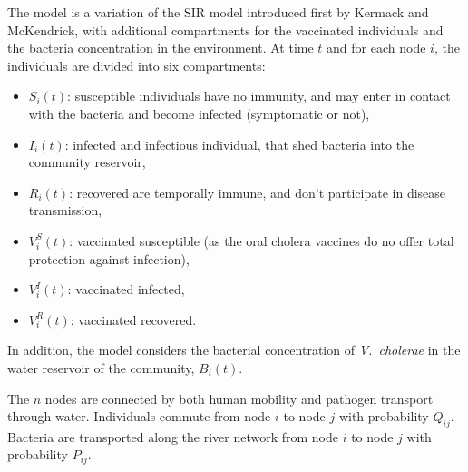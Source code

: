 The model is a variation of the SIR model introduced first by Kermack and McKendrick\cite{Kermack:ContributionMathematicalTheory:1927}, with additional compartments for the vaccinated individuals and the bacteria concentration in the environment. At time $t$ and for each node $i$, the individuals are divided into six compartments:
\begin{itemize}
\item $S_i(t)$: susceptible individuals  have no immunity, and may enter in contact with the bacteria and become infected (symptomatic or not),
\item $I_i(t)$: infected and infectious individual, that shed bacteria into the community reservoir,
\item $R_i(t)$: recovered are temporally immune, and don't participate in disease transmission,
\item $V^S_i(t)$: vaccinated susceptible (as the oral cholera vaccines do no offer total protection against infection),
\item $V^I_i(t)$: vaccinated infected,
\item $V^R_i(t)$: vaccinated recovered.
\end{itemize}

In addition, the model considers the bacterial concentration of \textit{V.~cholerae} in the water reservoir of the community, $B_i(t)$. 

The $n$ nodes are connected by both human mobility and pathogen transport through water. Individuals commute from node $i$ to node $j$ with probability $Q_{ij}$. Bacteria are transported along the river network from node $i$ to node $j$ with probability $P_{ij}$.

